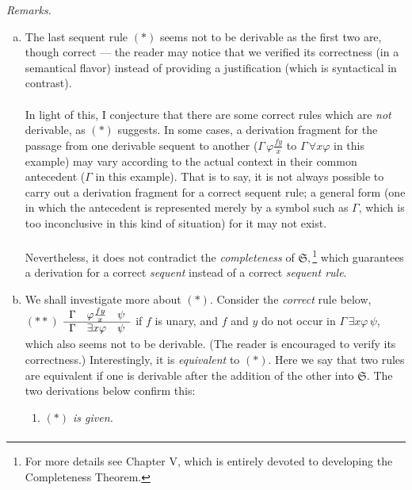 \begin{enumerate}[1.]
\textit{Remarks.}
\begin{enumerate}[(a)]
\item The last sequent rule $(*)$ seems not to be derivable as the first two are, though correct --- the reader may notice that we verified its correctness (in a semantical flavor) instead of providing a justification (which is syntactical in contrast).\\
\ \\
In light of this, I conjecture that there are some correct rules which are \emph{not} derivable,  as $(*)$ suggests. In some cases, a derivation fragment for the passage from one derivable sequent to another ($\Gamma \, \varphi\frac{fy}{x}$ to $\Gamma \, \forall x \varphi$ in this example) may vary according to the actual context in their common antecedent ($\Gamma$ in this example). That is to say, it is not always possible to carry out a derivation fragment for a correct sequent rule; a general form (one in which the antecedent is represented merely by a symbol such as $\Gamma$, which is too inconclusive in this kind of situation) for it may not exist.\\
\ \\
Nevertheless, it does not contradict the \emph{completeness} of $\mathfrak{S},$\footnote{For more details see Chapter V, which is entirely devoted to developing the Completeness Theorem.} which guarantees a derivation for a correct \emph{sequent} instead of a correct \emph{sequent rule}.
\item
We shall investigate more about $(*)$. Consider the \emph{correct} rule below,\\ \newline
$(**)$ \hfill $\begin{array}{lll}
\Gamma & \varphi\frac{fy}{x} & \psi \cr \hline
\Gamma & \exists x \varphi & \psi
\end{array}$ if $f$ is unary, and $f$ and $y$ do not occur in $\Gamma \, \exists x \varphi \, \psi$, \hfill \ \\ \newline
which also seems not to be derivable. (The reader is encouraged to verify its correctness.) Interestingly, it is \emph{equivalent} to $(*)$. Here we say that two rules are equivalent if one is derivable after the addition of the other into $\mathfrak{S}$. The two derivations below confirm this:
\begin{enumerate}[(1)]
\item \textit{$(*)$ is given.}
\[
\begin{array}{lllll}

\end{array}\]
\end{enumerate}
\end{enumerate}
\end{enumerate}
